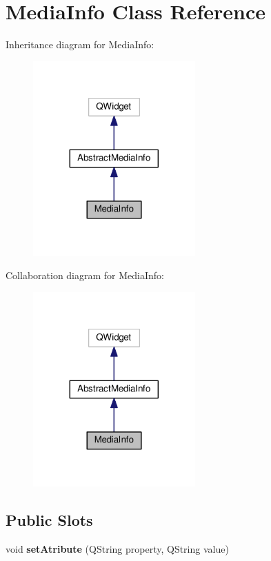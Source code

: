 \hypertarget{class_media_info}{\section{Media\-Info Class Reference}
\label{class_media_info}
}


Inheritance diagram for Media\-Info\-:
\nopagebreak
\begin{figure}[H]
\begin{center}
\leavevmode
\includegraphics[width=176pt]{class_media_info__inherit__graph}
\end{center}
\end{figure}


Collaboration diagram for Media\-Info\-:
\nopagebreak
\begin{figure}[H]
\begin{center}
\leavevmode
\includegraphics[width=176pt]{class_media_info__coll__graph}
\end{center}
\end{figure}
\subsection*{Public Slots}
\begin{DoxyCompactItemize}
\item 
\hypertarget{class_media_info_ac1a807582e0830e8f7a6167257a8b69a}{void {\bfseries set\-Atribute} (Q\-String property, Q\-String value)}\label{class_media_info_ac1a807582e0830e8f7a6167257a8b69a}

\end{DoxyCompactItemize}
